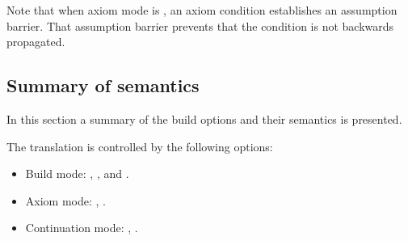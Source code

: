 Note that when axiom mode is , an axiom condition establishes
an assumption barrier. That assumption barrier prevents that the condition
is not backwards propagated.

\subsection{Summary of semantics}

In this section a summary of the build options and their semantics is presented.

The translation is controlled by the following options:

\begin{itemize}
  \item Build mode: , , and .
  \item Axiom mode: , .
  \item Continuation mode: , .
\end{itemize}

